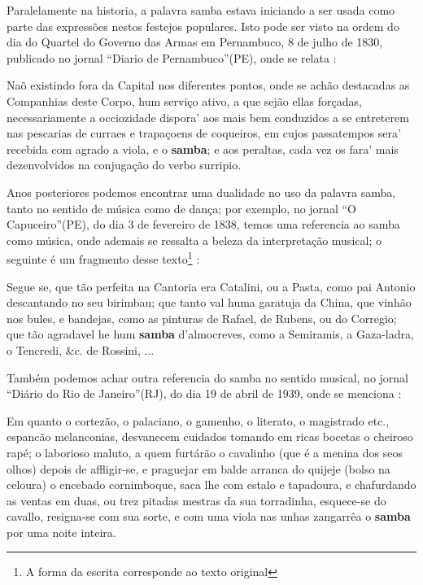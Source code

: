 Paralelamente na historia, a palavra samba estava iniciando a ser usada como parte
das expressões nestos festejos populares. 
Isto pode ser visto na ordem do dia do Quartel do Governo das Armas em
Pernambuco, 8 de julho de 1830, publicado no jornal ``Diario de Pernambuco''(PE), 
onde se  relata \cite[pp. 3]{sambadiariodepernanbuco}:
\begin{citando}%
Naõ existindo fora da Capital nos diferentes pontos,
onde se achão destacadas as Companhias deste Corpo, 
hum serviço ativo, a que sejão ellas forçadas, 
necessariamente a occiozidade dispora' 
aos mais bem conduzidos a se entreterem nas pescarias de curraes e trapaçoens de coqueiros,
em cujos passatempos sera' recebida com agrado a viola, e o \textbf{samba};
e aos peraltas, cada vez os fara' mais dezenvolvidos na conjugação do verbo surripio.
\end{citando}
Anos posteriores podemos encontrar uma dualidade no uso da palavra samba, 
tanto no sentido de música como de dança; por exemplo, no jornal ``O Capuceiro''(PE),
do dia 3 de fevereiro de 1838, temos uma referencia ao samba como música,
onde ademais se ressalta a beleza da interpretação musical;
o seguinte é um fragmento desse texto\footnote{\label{footort2}A forma da escrita corresponde ao texto original} \cite[pp. 1]{sambaperiodicoocapuceiro}:
\begin{citando}%
Segue se, que tão perfeita na Cantoria era Catalini, ou a Pasta,
como pai Antonio descantando no seu birimbau; que tanto val huma garatuja da China,
que vinhão nos bules, e bandejas,
como as pinturas de Rafael, de Rubens, ou do Corregio;
que tão agradavel he hum \textbf{samba} d'almocreves, como a Semiramis,
a Gaza-ladra, o Tencredi, \&c. de Rossini, ...
\end{citando}
Também podemos achar outra referencia do samba no sentido musical, no jornal ``Diário do Rio de Janeiro''(RJ),
do dia 19 de abril de 1939, onde se menciona \cite[pp. 1]{sambadiariorj1}:
\begin{citando}%
Em quanto o cortezão, o palaciano, o gamenho, o literato, o magistrado etc., 
espancão melanconias, desvanecem cuidados tomando em ricas bocetas o cheiroso rapé;
o laborioso maluto, a quem furtárão o cavalinho (que é a menina dos seos olhos)
depois de affligir-se, e praguejar em balde arranca do quijeje (bolso na celoura)
o encebado cornimboque, saca lhe com estalo e tapadoura, e chafurdando as ventas em duas,
ou trez pitadas mestras da sua torradinha, esquece-se do cavallo, resigna-se com sua sorte,
e com uma viola nas unhas zangarrêa o \textbf{samba} por uma noite inteira.
\end{citando}

